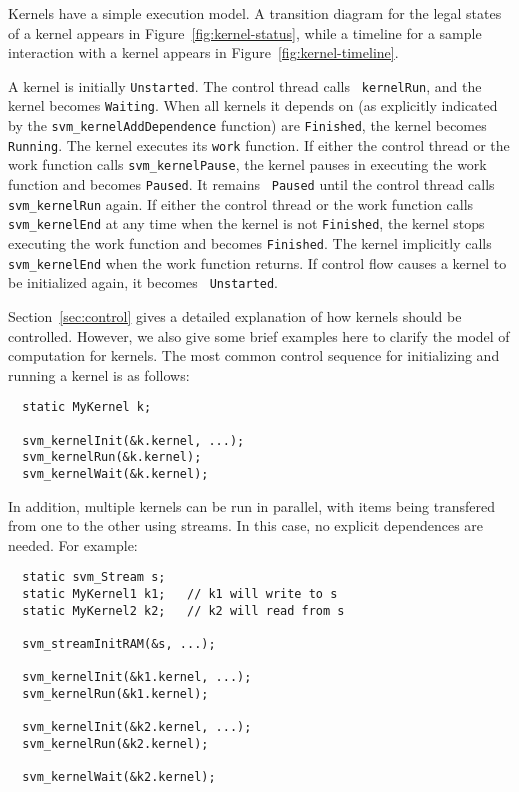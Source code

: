 Kernels have a simple execution model. A transition diagram for the
legal states of a kernel appears in Figure~\ref{fig:kernel-status},
while a timeline for a sample interaction with a kernel appears in
Figure~\ref{fig:kernel-timeline}.

A kernel is initially {\tt Unstarted}.  The control thread calls {\tt
kernelRun}, and the kernel becomes {\tt Waiting}.  When all kernels it
depends on (as explicitly indicated by the {\tt svm\_kernelAddDependence}
function) are {\tt Finished}, the kernel becomes {\tt Running}. The
kernel executes its {\tt work} function.  If either the control thread
or the work function calls {\tt svm\_kernelPause}, the kernel pauses in
executing the work function and becomes {\tt Paused}. It remains {\tt
Paused} until the control thread calls {\tt svm\_kernelRun} again. If
either the control thread or the work function calls {\tt svm\_kernelEnd}
at any time when the kernel is not {\tt Finished}, the kernel stops
executing the work function and becomes {\tt Finished}. The kernel
implicitly calls {\tt svm\_kernelEnd} when the work function returns. If
control flow causes a kernel to be initialized again, it becomes {\tt
Unstarted}.

Section~\ref{sec:control} gives a detailed explanation of how kernels
should be controlled.  However, we also give some brief examples here
to clarify the model of computation for kernels.  The most common
control sequence for initializing and running a kernel is as follows:

{\small
\begin{verbatim}
  static MyKernel k;

  svm_kernelInit(&k.kernel, ...);
  svm_kernelRun(&k.kernel);
  svm_kernelWait(&k.kernel);
\end{verbatim}}

In addition, multiple kernels can be run in parallel, with items being
transfered from one to the other using streams.  In this case, no
explicit dependences are needed.  For example:

{\small
\begin{verbatim}
  static svm_Stream s;
  static MyKernel1 k1;   // k1 will write to s
  static MyKernel2 k2;   // k2 will read from s

  svm_streamInitRAM(&s, ...);

  svm_kernelInit(&k1.kernel, ...);  
  svm_kernelRun(&k1.kernel);

  svm_kernelInit(&k2.kernel, ...);
  svm_kernelRun(&k2.kernel);

  svm_kernelWait(&k2.kernel);
\end{verbatim}}


